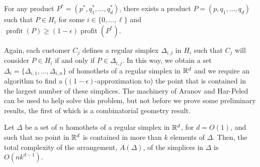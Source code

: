 \documentclass[lotsofwhite]{patmorin}
\newcommand{\val}{\operatorname{profit}}
\newcommand{\eps}{\epsilon}
\begin{document}
\begin{lem}
  For any product $P^*=(p^*,q_1^*,\ldots,q_d^*)$, there exists
  a product $P=(p,q_1,\ldots,q_d)$ such that $P\in H_i$ for some
  $i\in\{0,\ldots,\ell\}$ and $\val(P) \ge (1-\eps)\val(P^*)$.
\end{lem}

Again, each customer $C_j$ defines a regular simplex $\Delta_{i,j}$
in $H_{i}$ such that $C_j$ will consider $P\in H_i$ if and
only if $P\in\Delta_{i,j}$.  In this way, we obtain a set
$\Delta_i=\{\Delta_{i,1},\ldots,\Delta_{i,n}\}$ of homothets of
a regular simplex in $\mathbb{R}^d$ and we require an algorithm to find a
($(1-\eps)$-approximation to) the point that is contained in the largest
number of these simplices.  The machinery of Aranov and Har-Peled
\cite{ah08} can be used to help solve this problem, but not before we
prove some preliminary results, the first of which is a combinatorial
geometry result.

\begin{lem}
  Let $\Delta$ be a set of $n$ homothets of a regular simplex in $\mathbb{R}^d$,
  for $d=O(1)$, and such that no point in $\mathbb{R}^d$ is contained in more
  than $k$ elements of $\Delta$.  Then, the total complexity of the
  arrangement, $A(\Delta)$, of the simplices in $\Delta$ is $O(nk^{d-1})$.
\end{lem}
\end{document}
